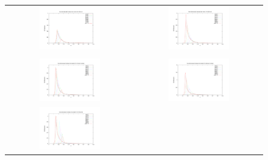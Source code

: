 \begin{figure}[h!]
\begin{tabular}{cc}
  \includegraphics[width=0.5\textwidth]{variance_ad_free_mesh_t5_v10.pdf} &
  \includegraphics[width=0.5\textwidth]{variance_ad_free_mesh_t5_v20.pdf}\\\\
  \includegraphics[width=0.5\textwidth]{variance_ad_free_mesh_t6_v10.pdf} &
  \includegraphics[width=0.5\textwidth]{variance_ad_free_mesh_t6_fine_v20.pdf}\\
  \includegraphics[width=0.5\textwidth]{variance_ad_free_mesh_t6b_v10.pdf} &

\end{tabular}
\end{figure}
